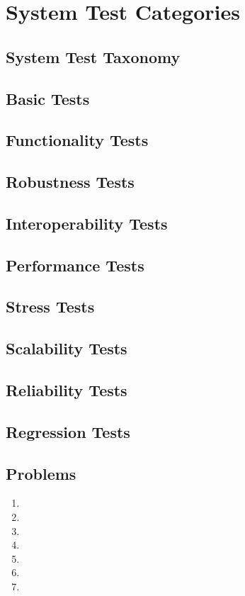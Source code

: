 \setchapterpreamble[u]{\margintoc}
\chapter{System Test Categories}
\section{System Test Taxonomy}
\section{Basic Tests}
\section{Functionality Tests}
\section{Robustness Tests}
\section{Interoperability Tests}
\section{Performance Tests}
\section{Stress Tests}
\section{Scalability Tests}
\section{Reliability Tests}
\section{Regression Tests}
\section{Problems}
\begin{enumerate}
    \item 
    \item 
    \item 
    \item 
    \item 
    \item
    \item 
\end{enumerate}